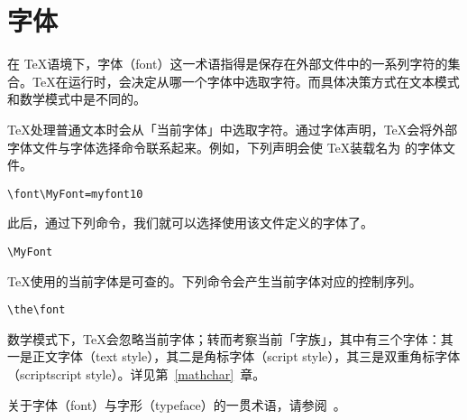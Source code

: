 \documentclass{book}
\begin{document}
\section{字体}

在 \TeX 语境下，字体（font）这一术语指得是保存在外部文件中的一系列字符的集合。\TeX 在运行时，会决定从哪一个字体中选取字符。而具体决策方式在文本模式和数学模式中是不同的。

\TeX 处理普通文本时会从「当前字体」中选取字符。通过字体声明，\TeX 会将外部字体文件与字体选择命令联系起来。例如，下列声明会使 \TeX 装载名为  的字体文件。
\begin{verbatim}
\font\MyFont=myfont10
\end{verbatim}
此后，通过下列命令，我们就可以选择使用该文件定义的字体了。
\begin{verbatim}
\MyFont
\end{verbatim}
\TeX 使用的当前字体是可查的。下列命令会产生当前字体对应的控制序列。
\begin{verbatim}
\the\font
\end{verbatim}

数学模式下，\TeX 会忽略当前字体；转而考察当前「字族」，其中有三个字体：其一是正文字体（text style），其二是角标字体（script style），其三是双重角标字体（scriptscript style）。详见第~\ref{mathchar}~章。

关于字体（font）与字形（typeface）的一贯术语，请参阅~\cite{S}。
\end{document}
